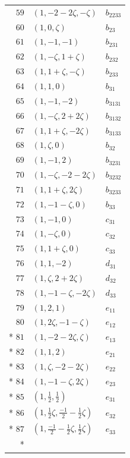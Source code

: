 \documentclass[aps,pra,reprint,superscriptaddress,longbibliography,nofootinbib,floatfix,10pt]{revtex4-2}
\theoremstyle{definition}
\begin{document}
\begin{longtable}{rll}
$59$ & $(1,-2-2\zeta,-\zeta)$ & $b_{2233}$\\
$60$ & $(1,0,\zeta)$ & $b_{23}$\\
$61$ & $(1,-1,-1)$ & $b_{231}$\\
$62$ & $(1,-\zeta,1+\zeta)$ & $b_{232}$\\
$63$ & $(1,1+\zeta,-\zeta)$ & $b_{233}$\\
$64$ & $(1,1,0)$ & $b_{31}$\\
$65$ & $(1,-1,-2)$ & $b_{3131}$\\
$66$ & $(1,-\zeta,2+2\zeta)$ & $b_{3132}$\\
$67$ & $(1,1+\zeta,-2\zeta)$ & $b_{3133}$\\
$68$ & $(1,\zeta,0)$ & $b_{32}$\\
$69$ & $(1,-1,2)$ & $b_{3231}$\\
$70$ & $(1,-\zeta,-2-2\zeta)$ & $b_{3232}$\\
$71$ & $(1,1+\zeta,2\zeta)$ & $b_{3233}$\\
$72$ & $(1,-1-\zeta,0)$ & $b_{33}$\\
$73$ & $(1,-1,0)$ & $c_{31}$\\
$74$ & $(1,-\zeta,0)$ & $c_{32}$\\
$75$ & $(1,1+\zeta,0)$ & $c_{33}$\\
$76$ & $(1,1,-2)$ & $d_{31}$\\
$77$ & $(1,\zeta,2+2\zeta)$ & $d_{32}$\\
$78$ & $(1,-1-\zeta,-2\zeta)$ & $d_{33}$\\
$79$ & $(1,2,1)$ & $e_{11}$\\
$80$ & $(1,2\zeta,-1-\zeta)$ & $e_{12}$\\*
$81$ & $(1,-2-2\zeta,\zeta)$ & $e_{13}$\\*
$82$ & $(1,1,2)$ & $e_{21}$\\*
$83$ & $(1,\zeta,-2-2\zeta)$ & $e_{22}$\\*
$84$ & $(1,-1-\zeta,2\zeta)$ & $e_{23}$\\*
$85$ & $(1,\frac{1}{2},\frac{1}{2})$ & $e_{31}$\\*
$86$ & $(1,\frac{1}{2}\zeta,\frac{-1}{2}-\frac{1}{2}\zeta)$ & $e_{32}$\\*
$87$ & $(1,\frac{-1}{2}-\frac{1}{2}\zeta,\frac{1}{2}\zeta)$ & $e_{33}$\\*
\end{longtable}
\endgroup
\begingroup\small
{}
\end{document}
